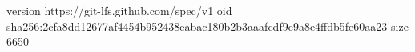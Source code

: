 version https://git-lfs.github.com/spec/v1
oid sha256:2cfa8dd12677af4454b952438eabac180b2b3aaafcdf9e9a8e4ffdb5fe60aa23
size 6650

